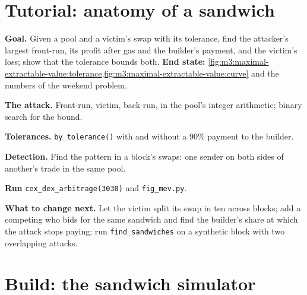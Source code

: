 \section{Tutorial: anatomy of a sandwich}\label{tut:m3:maximal-extractable-value:sandwich}

\begin{tutorial}
\textbf{Goal.} Given a pool and a victim's swap with its tolerance, find the attacker's largest front-run, its profit after gas and the builder's
payment, and the victim's loss; show that the tolerance bounds both. \textbf{End state:}
\cref{fig:m3:maximal-extractable-value:tolerance,fig:m3:maximal-extractable-value:curve} and the numbers of the weekend problem.
\begin{tutsteps}
\item \textbf{The attack.} Front-run, victim, back-run, in the pool's integer arithmetic; binary search for the bound.
\label{lst:m3:maximal-extractable-value:sandwich}
\item \textbf{Tolerances.} \texttt{by\_tolerance()} with and without a 90\% payment to the builder.
\item \textbf{Detection.} Find the pattern in a block's swaps: one sender on both sides of another's trade in the same pool.
\label{lst:m3:maximal-extractable-value:detect}
\item \textbf{Run} \texttt{cex\_dex\_arbitrage(3030)} and \texttt{fig\_mev.py}.
\end{tutsteps}
\textbf{What to change next.} Let the victim split its swap in ten across blocks; add a competing  who bids for the same sandwich and find the
builder's share at which the attack stops paying; run \texttt{find\_sandwiches} on a synthetic block with two overlapping attacks.
\end{tutorial}

\section{Build: the sandwich simulator}\label{bld:m3:maximal-extractable-value:sandwich}

